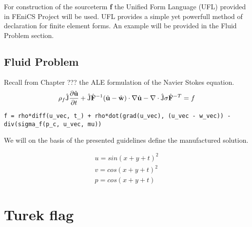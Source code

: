 For construction of the sourceterm \textbf{f} the Unified Form Language (UFL) \cite{Project2016} provided in FEniCS Project will be used. UFL provides a simple yet powerfull method of declaration for finite element forms. An example will be provided in the Fluid Problem section. 

\subsection{Fluid Problem}
Recall from Chapter ??? the ALE formulation of the Navier Stokes equation. 
\begin{align*}
\rho_f \ha{J}\pder{\hat{u}}{t} + \ha{J} \hat{F}^{-1} (\hat{u} - \hat{w})\cdot \nabla \hat{u} 
- \nabla \cdot \ha{J} \sigma \hat{F}^{-T} = f
\end{align*}

\begin{lstlisting}[style=python]
f = rho*diff(u_vec, t_) + rho*dot(grad(u_vec), (u_vec - w_vec)) - div(sigma_f(p_c, u_vec, mu))
\end{lstlisting}

We will on the basis of the presented guidelines define the manufactured solution.

\begin{align*}
u = sin(x + y + t)^2 \\
v = cos(x + y +  t)^2 \\
p = cos(x + y + t)
\end{align*}


                                                                                                                                                   
\section{Turek flag}